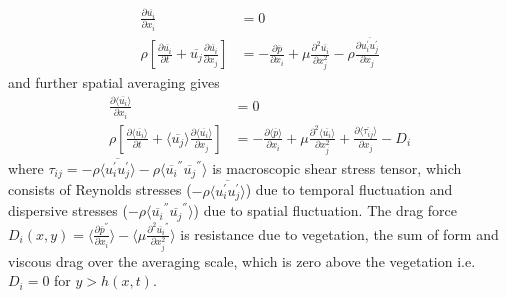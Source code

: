 \documentclass[12pt]{report}   %
\renewcommand{\bar}{\overline}
\begin{document}
 \begin{equation}
 \begin{split}
 \frac{\partial \bar{u_i} }{\partial x_i} &=0 \\
 \rho \left[ \frac{\partial  \overline{u_i}  }{\partial t}+  \overline{u_j}  \frac{\partial  \overline{u_i} }{\partial x_j} \right ] &= -\frac{\partial  \bar{p}   }{\partial x_i} + \mu \frac{\partial^2  \overline{u_i}  }{\partial x_j^2} - \rho \frac{\partial  \overline { u_i^{'} u_j^{'} }  }{\partial x_j} 
 \end{split}
 \end{equation}
 and further spatial averaging gives
  \begin{equation}\label{averaged_eq}
  \begin{split}
  \frac{\partial \langle \bar{u_i} \rangle}{\partial x_i}&=0 \\
 \rho \left[ \frac{\partial \langle \overline{u_i} \rangle }{\partial t}+ \langle \overline{u_j} \rangle \frac{\partial \langle \bar{u_i} \rangle}{\partial x_j} \right ] &= -\frac{\partial \langle \bar{p} \rangle  }{\partial x_i} + \mu \frac{\partial^2 \langle \bar{u_i} \rangle }{\partial         x_j^2} + \frac{\partial \langle \bar{\tau_{ij}} \rangle }{\partial x_j} -D_i
 \end{split}
 \end{equation}
 where $\tau_{ij}=-\rho \langle \overline{u_i^{'} u_j^{'}} \rangle  -\rho \langle{ \overline{u_i}^{''} \overline{u_j}^{''} } \rangle  $ is macroscopic shear stress tensor, which consists of Reynolds stresses ($ -\rho \langle \overline {u_i^{'} u_j^{'}} \rangle $) due to temporal fluctuation and dispersive stresses ($ -\rho \langle{ \overline{u_i}^{''} \overline{u_j}^{''} } \rangle $) due to spatial fluctuation. The drag force $D_i(x,y) = \langle \frac{\partial \overline{p}^{''}}{\partial x_i} \rangle - \langle \mu \frac{\partial^2 \bar{u_i}^{''} }{\partial x_j^2} \rangle $ is resistance due to vegetation, the sum of form and viscous drag over the averaging scale, which is zero above the vegetation i.e. $D_i = 0 $ for $y>h(x,t)$. 
 
\end{document}

